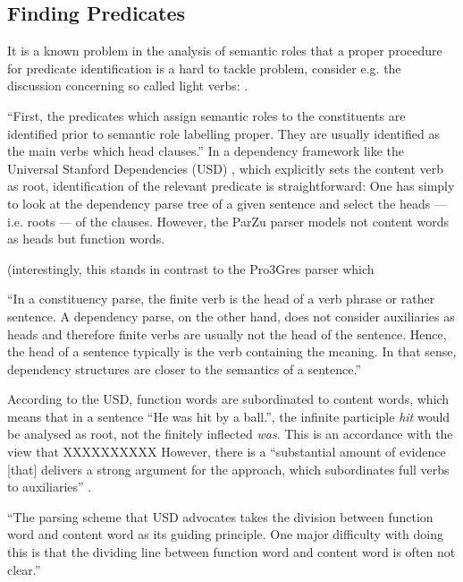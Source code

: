 \subsection{Finding Predicates}

It is a known problem in the analysis of semantic roles that a proper procedure for predicate identification is a hard to tackle problem, consider e.g. the discussion concerning so called light verbs: \cite{wittenberg2016light}.

``First, the predicates which assign semantic roles to the constituents are identified prior to semantic role labelling proper. They are usually identified as the main verbs which head clauses.'' \citep[p.~74]{samardzic2013dynamics}
In a dependency framework like the Universal Stanford Dependencies (USD) \citep{de2014universal}, which explicitly sets the content verb as root, identification of the relevant predicate is straightforward:
One has simply to look at the dependency parse tree of a given sentence and select the heads --- i.e. roots --- of the clauses.
However, the ParZu parser models not content words as heads but function words.

(interestingly, this stands in contrast to the Pro3Gres parser \citep{schneider2008hybrid} which 

``In a constituency parse, the finite verb is the head of a verb phrase or rather sentence.
A dependency parse, on the other hand, does not consider auxiliaries as heads and therefore finite verbs are usually not the head of the sentence.
Hence, the head of a sentence typically is the verb containing the meaning.
In that sense, dependency structures are closer to the semantics of a sentence.'' \citep[p.~6f.]{aepli2018parsing}

According to the USD, function words are subordinated to content words, which means that in a sentence ``He was hit by a ball.'', the infinite participle \textit{hit} would be analysed as root, not the finitely inflected \textit{was}.
This is an accordance with the view that XXXXXXXXXX
However, there is a ``substantial amount of evidence [that] delivers a strong argument for the \textelp{} approach, which subordinates full verbs to auxiliaries'' \cite{gross2015dependency}.

``The parsing scheme that USD advocates takes the division between function word and content word as its guiding principle.
One major difficulty with doing this is that the dividing line between function word and content word is often not clear.'' \cite{gross2015dependency}



